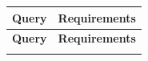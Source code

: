 \documentclass[12pt,a4paper,oneside]{article}
\begin{document}
\begin{center}
\begin{longtable}{|l|p{8cm}|}
  \hline
  \textbf{Query} & \textbf{Requirements} \\
  \hline\hline
  \endfirsthead
  \hline
  \textbf{Query} & \textbf{Requirements} \\
  \hline\hline
  \endhead
  \endlastfoot


\end{longtable}
\end{center}
\end{document}
